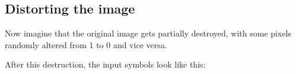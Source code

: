 \documentclass[a4paper,12pt,polish]{jupyterBook}
\begin{document}
\subsection{Distorting the image}
\label{\detokenize{docs/memory:distorting-the-image}}
\sphinxAtStartPar
Now imagine that the original image gets partially destroyed, with some pixels randomly altered from 1 to 0 and vice versa.
\begin{sphinxVerbatimInput}

\begin{sphinxVerbatim}[commandchars=\\\{\}]
   

                        
                  
         
         
        \PYG{p}{[}\PYG{p}{]}\PYG{p}{[}\PYG{p}{]}           
\end{sphinxVerbatim}
\end{sphinxVerbatimInput}

\sphinxAtStartPar
After this destruction, the input symbols look like this:
\begin{sphinxVerbatimOutput}

\noindent{}
\end{sphinxVerbatimOutput}
\end{document}
